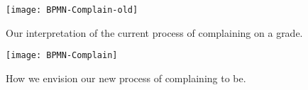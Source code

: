 \begin{figure}[H]
    \centering
    \texttt{[image: BPMN-Complain-old]}
    \caption{Our interpretation of the current process of complaining on a grade.}
    \label{fig:Complain-old}
\end{figure}

\begin{figure}[H]
    \centering
    \texttt{[image: BPMN-Complain]}
    \caption{How we envision our new process of complaining to be.}
    \label{fig:Complain-new}
\end{figure}
